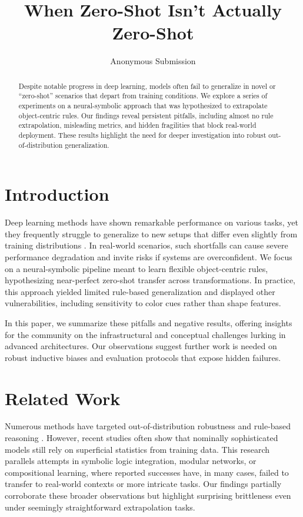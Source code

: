 \documentclass{article}
\title{\bf When Zero-Shot Isn't Actually Zero-Shot}
\author{Anonymous Submission}
\date{}
\begin{document}
\maketitle

\begin{abstract}
Despite notable progress in deep learning, models often fail to generalize in novel or ``zero-shot'' scenarios that depart from training conditions. We explore a series of experiments on a neural-symbolic approach that was hypothesized to extrapolate object-centric rules. Our findings reveal persistent pitfalls, including almost no rule extrapolation, misleading metrics, and hidden fragilities that block real-world deployment. These results highlight the need for deeper investigation into robust out-of-distribution generalization.
\end{abstract}

\section{Introduction}
Deep learning methods have shown remarkable performance on various tasks, yet they frequently struggle to generalize to new setups that differ even slightly from training distributions \cite{he2016resnet}. In real-world scenarios, such shortfalls can cause severe performance degradation and invite risks if systems are overconfident. We focus on a neural-symbolic pipeline meant to learn flexible object-centric rules, hypothesizing near-perfect zero-shot transfer across transformations. In practice, this approach yielded limited rule-based generalization and displayed other vulnerabilities, including sensitivity to color cues rather than shape features.

In this paper, we summarize these pitfalls and negative results, offering insights for the community on the infrastructural and conceptual challenges lurking in advanced architectures. Our observations suggest further work is needed on robust inductive biases and evaluation protocols that expose hidden failures.

\section{Related Work}
Numerous methods have targeted out-of-distribution robustness and rule-based reasoning \cite{icbinb}. However, recent studies often show that nominally sophisticated models still rely on superficial statistics from training data. This research parallels attempts in symbolic logic integration, modular networks, or compositional learning, where reported successes have, in many cases, failed to transfer to real-world contexts or more intricate tasks. Our findings partially corroborate these broader observations but highlight surprising brittleness even under seemingly straightforward extrapolation tasks.
\end{document}
